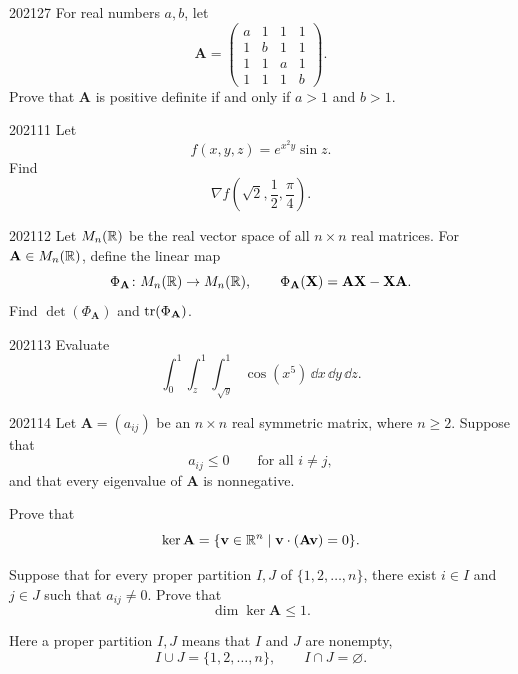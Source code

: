 \begin{problem}{2021}{2}{7}
For real numbers $a, b$, let
\[
    \mathbf A=
    \begin{pmatrix}
        a&1&1&1\\
        1&b&1&1\\
        1&1&a&1\\
        1&1&1&b
    \end{pmatrix}.
\]
Prove that $\mathbf A$ is positive definite if and only if $a>1$ and $b>1$.
\end{problem}

\begin{problem}{2021}{1}{1}
Let
\[
    f(x, y, z)=e^{x^2y}\sin z.
\]
Find
\[
    \nabla f\left(\sqrt2, \frac12, \frac\pi4\right).
\]
\end{problem}

\begin{problem}{2021}{1}{2}
Let $M_n(\mathbb{R})$ be the real vector space of all $n\times n$ real matrices. For $\mathbf A\in M_n(\mathbb{R})$, define the linear map
\[
    \Phi_{\mathbf A}\colon M_n(\mathbb{R})\to M_n(\mathbb{R}),
    \qquad
    \Phi_{\mathbf A}(\mathbf X)=\mathbf A\mathbf X-\mathbf X\mathbf A.
\]
Find $\det(\Phi_{\mathbf A})$ and $\operatorname{tr}(\Phi_{\mathbf A})$.
\end{problem}

\begin{problem}{2021}{1}{3}
Evaluate
\[
    \int_0^1\int_z^1\int_{\sqrt y}^1
    \cos(x^5)\, \dd x\, \dd y\, \dd z.
\]
\end{problem}

\begin{problem}{2021}{1}{4}
Let $\mathbf A=(a_{ij})$ be an $n\times n$ real symmetric matrix, where $n\ge2$. Suppose that
\[
    a_{ij}\le0
    \qquad\text{for all }i\ne j,
\]
and that every eigenvalue of $\mathbf A$ is nonnegative.
\begin{problemsubparts}
    \item Prove that
    \[
        \ker\mathbf A
        =
        \{\mathbf v\in\mathbb{R}^n\mid \mathbf v\cdot(\mathbf A\mathbf v)=0\}.
    \]
    \item Suppose that for every proper partition $I, J$ of $\{1, 2, \dots, n\}$, there exist $i\in I$ and $j\in J$ such that $a_{ij}\ne0$. Prove that
    \[
        \dim\ker\mathbf A\le1.
    \]
\end{problemsubparts}
Here a proper partition $I, J$ means that $I$ and $J$ are nonempty,
\[
    I\cup J=\{1, 2, \dots, n\},
    \qquad
    I\cap J=\varnothing.
\]
\end{problem}


